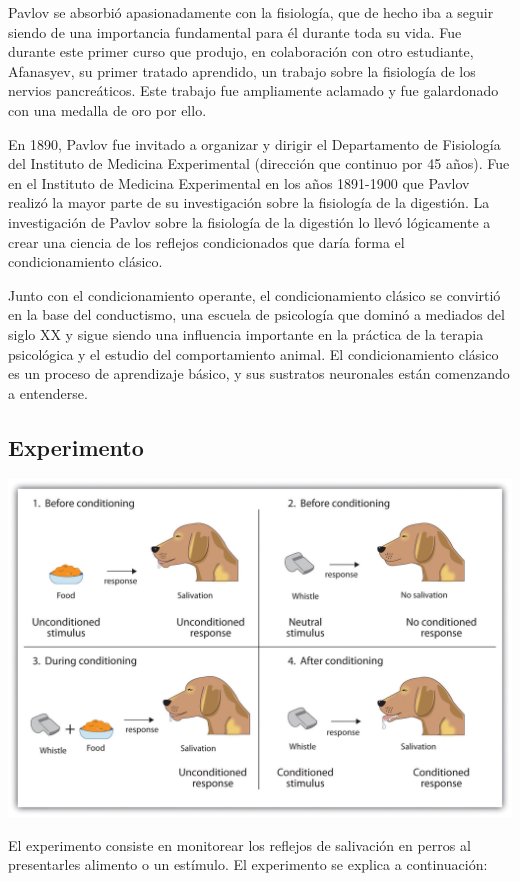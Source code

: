 \documentclass[letterpaper, 10pt, journal]{IEEEtran}
\begin{document}
Pavlov se absorbió apasionadamente con la fisiología, que de hecho iba a seguir siendo de una importancia fundamental para él durante toda su vida. Fue durante este primer curso que produjo, en colaboración con otro estudiante, Afanasyev, su primer tratado aprendido, un trabajo sobre la fisiología de los nervios pancreáticos. Este trabajo fue ampliamente aclamado y fue galardonado con una medalla de oro por ello.

En 1890, Pavlov fue invitado a organizar y dirigir el Departamento de Fisiología del Instituto de Medicina Experimental (dirección que continuo por 45 años). Fue en el Instituto de Medicina Experimental en los años 1891-1900 que Pavlov realizó la mayor parte de su investigación sobre la fisiología de la digestión. 
La investigación de Pavlov sobre la fisiología de la digestión lo llevó lógicamente a crear una ciencia de los reflejos condicionados que daría forma el condicionamiento clásico. 

Junto con el condicionamiento operante, el condicionamiento clásico se convirtió en la base del conductismo, una escuela de psicología que dominó a mediados del siglo XX y sigue siendo una influencia importante en la práctica de la terapia psicológica y el estudio del comportamiento animal. El condicionamiento clásico es un proceso de aprendizaje básico, y sus sustratos neuronales están comenzando a entenderse.

\subsection{Experimento}

\includegraphics[scale=0.12]{parlov}

El experimento consiste en monitorear los reflejos de salivación en perros al presentarles alimento o un estímulo. El experimento se explica a continuación:
\end{document}
